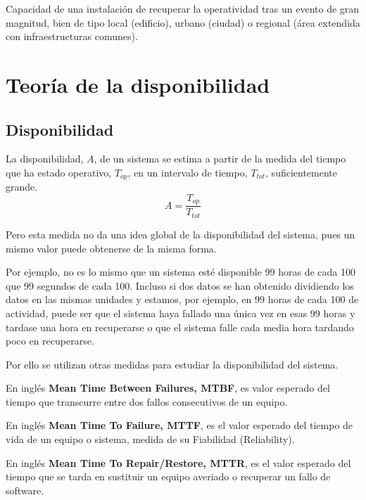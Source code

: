 \begin{defn}
Capacidad de una instalación de
recuperar la operatividad tras un evento de gran magnitud, bien de tipo local (edificio), urbano (ciudad) o regional (área extendida con infraestructuras comunes).
\end{defn}

\section{Teoría de la disponibilidad}
\subsection{Disponibilidad}
La disponibilidad, $A$, de un sistema se estima a partir de la medida del tiempo que ha estado operativo, $T_{op}$, en un intervalo de tiempo, $T_{tot}$, suficientemente grande.
\[A= \frac{T_{op}}{T_{tot}}\]

Pero esta medida no da una idea global de la disponibilidad del sistema, pues un mismo valor puede obtenerse de la misma forma.

Por ejemplo, no es lo mismo que un sistema esté disponible 99 horas de cada 100 que 99 segundos de cada 100. Incluso si dos datos se han obtenido dividiendo los datos en las mismas unidades y estamos, por ejemplo, en 99 horas de cada 100 de actividad, puede ser que el sistema haya fallado una única vez en esas 99 horas y tardase una hora en recuperarse o que el sistema falle cada media hora tardando poco en recuperarse.

Por ello se utilizan otras medidas para estudiar la disponibilidad del sistema.

\begin{defn}

En inglés \textbf{Mean Time Between Failures, MTBF}, es valor esperado del tiempo que transcurre entre dos fallos consecutivos de un equipo.
\end{defn}

\begin{defn}

En inglés \textbf{Mean Time To Failure, MTTF}, es el valor esperado del tiempo de vida de un equipo o sistema, medida de su Fiabilidad (Reliability).
\end{defn}

\begin{defn}

En inglés \textbf{Mean Time To Repair/Restore, MTTR}, es el valor esperado del tiempo que se tarda en sustituir un equipo averiado o recuperar un fallo de software.
\end{defn}

